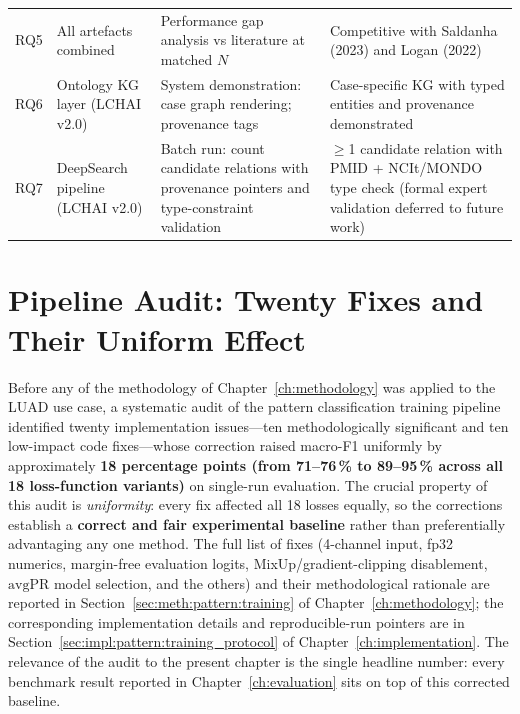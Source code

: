 \begin{table}[ht!]
\begin{tabular}{c p{3.8cm} p{3.5cm} p{3.5cm}}
RQ5 & All artefacts combined & Performance gap analysis vs literature at
matched $N$ & Competitive with Saldanha (2023) and Logan (2022) \\
RQ6 & Ontology KG layer (LCHAI v2.0) &
  System demonstration: case graph rendering; provenance tags &
  Case-specific KG with typed entities and provenance demonstrated \\
RQ7 & DeepSearch pipeline (LCHAI v2.0) &
  Batch run: count candidate relations with provenance pointers and
  type-constraint validation &
  $\geq$1 candidate relation with PMID + NCIt/MONDO type check
  (formal expert validation deferred to future work) \\
\hline
\end{tabular}
\end{table}


\section{Pipeline Audit: Twenty Fixes and Their Uniform Effect}
\label{sec:uc:pipeline_fixes}

Before any of the methodology of Chapter~\ref{ch:methodology} was
applied to the LUAD use case, a systematic audit of the pattern
classification training pipeline identified twenty implementation
issues---ten methodologically significant and ten low-impact code
fixes---whose correction raised macro-F1 uniformly by approximately
\textbf{18 percentage points (from 71--76\,\% to 89--95\,\% across all
18 loss-function variants)} on single-run evaluation.
The crucial property of this audit is \emph{uniformity}: every fix
affected all 18 losses equally, so the corrections establish a
\textbf{correct and fair experimental baseline} rather than
preferentially advantaging any one method.
The full list of fixes (4-channel input, fp32 numerics, margin-free
evaluation logits, MixUp/gradient-clipping disablement, $\mathrm{avgPR}$
model selection, and the others) and their methodological rationale
are reported in
Section~\ref{sec:meth:pattern:training} of
Chapter~\ref{ch:methodology}; the corresponding implementation
details and reproducible-run pointers are in
Section~\ref{sec:impl:pattern:training_protocol} of
Chapter~\ref{ch:implementation}.
The relevance of the audit to the present chapter is the single
headline number: every benchmark result reported in
Chapter~\ref{ch:evaluation} sits on top of this corrected baseline.


